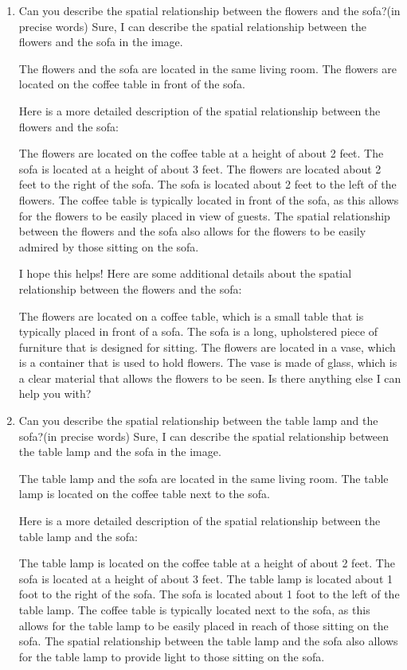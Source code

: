 \begin{enumerate}
    \item Can you describe the spatial relationship between the flowers and the sofa?(in precise words)
    \subitem Sure, I can describe the spatial relationship between the flowers and the sofa in the image.

    The flowers and the sofa are located in the same living room. The flowers are located on the coffee table in front of the sofa.
    
    Here is a more detailed description of the spatial relationship between the flowers and the sofa:
    
    The flowers are located on the coffee table at a height of about 2 feet.
    The sofa is located at a height of about 3 feet.
    The flowers are located about 2 feet to the right of the sofa.
    The sofa is located about 2 feet to the left of the flowers.
    The coffee table is typically located in front of the sofa, as this allows for the flowers to be easily placed in view of guests. The spatial relationship between the flowers and the sofa also allows for the flowers to be easily admired by those sitting on the sofa.
    
    I hope this helps!
    Here are some additional details about the spatial relationship between the flowers and the sofa:

    The flowers are located on a coffee table, which is a small table that is typically placed in front of a sofa.
    The sofa is a long, upholstered piece of furniture that is designed for sitting.
    The flowers are located in a vase, which is a container that is used to hold flowers.
    The vase is made of glass, which is a clear material that allows the flowers to be seen.
    Is there anything else I can help you with?
    \item Can you describe the spatial relationship between the table lamp and the sofa?(in precise words)
    \subitem 
    Sure, I can describe the spatial relationship between the table lamp and the sofa in the image.
    
    The table lamp and the sofa are located in the same living room. The table lamp is located on the coffee table next to the sofa.
    
    Here is a more detailed description of the spatial relationship between the table lamp and the sofa:
    
    The table lamp is located on the coffee table at a height of about 2 feet.
    The sofa is located at a height of about 3 feet.
    The table lamp is located about 1 foot to the right of the sofa.
    The sofa is located about 1 foot to the left of the table lamp.
    The coffee table is typically located next to the sofa, as this allows for the table lamp to be easily placed in reach of those sitting on the sofa. The spatial relationship between the table lamp and the sofa also allows for the table lamp to provide light to those sitting on the sofa.
    

\end{enumerate}
